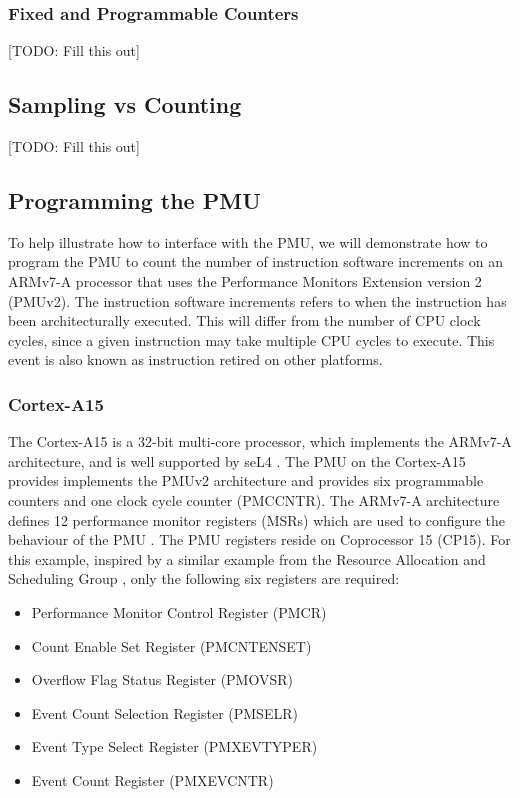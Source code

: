 {\subsubsection{Fixed and Programmable Counters}

[TODO: Fill this out]

\subsection{Sampling vs Counting}\label{sect:sampling_counting}

[TODO: Fill this out]

\subsection{Programming the PMU}\label{sect:programming_pmu}

To help illustrate how to interface with the PMU, we will demonstrate how to program the PMU to count the number of instruction software increments on an ARMv7-A processor that uses the Performance Monitors Extension version 2 (PMUv2). The instruction software increments refers to when the instruction has been architecturally executed. This will differ from the number of CPU clock cycles, since a given instruction may take multiple CPU cycles to execute. This event is also known as instruction retired on other platforms.

\subsubsection{Cortex-A15}

The Cortex-A15 is a 32-bit multi-core processor, which implements the ARMv7-A architecture, and is well supported by seL4 \cite{DocsSeL4Hardware}. The PMU on the Cortex-A15 provides implements the PMUv2 architecture and provides six programmable counters \cite{DocsArmCortexA15PMU} and one clock cycle counter (PMCCNTR). The ARMv7-A architecture defines 12 performance monitor registers (MSRs) which are used to configure the behaviour of the PMU \cite{DocsArmv7PMURegs}. The PMU registers reside on Coprocessor 15 (CP15). For this example, inspired by a similar example from the Resource Allocation and Scheduling Group \cite{TutHowToUsePMU}, only the following six registers are required:

\ssp

\begin{itemize}
    \item Performance Monitor Control Register (PMCR)
    \item Count Enable Set Register (PMCNTENSET)
    \item Overflow Flag Status Register (PMOVSR)
    \item Event Count Selection Register (PMSELR)
    \item Event Type Select Register (PMXEVTYPER)
    \item Event Count Register (PMXEVCNTR)
\end{itemize}

}
